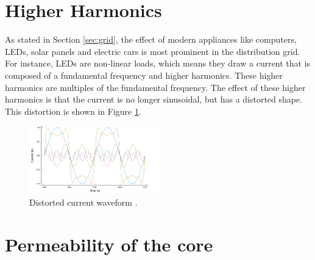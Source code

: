 \section{Higher Harmonics}
As stated in Section \ref{sec:grid}, the effect of modern appliances like computers, LEDs, solar panels and electric cars is most prominent in the distribution grid.
For instance, LEDs are non-linear loads, which means they draw a current that is composed of a fundamental frequency and higher harmonics.
These higher harmonics are multiples of the fundamental frequency. The effect of these higher harmonics is that the current is no longer sinusoidal, but has a distorted shape.
This distortion is shown in Figure \ref{fig:higherharmonics}.
\begin{figure}
    \centering
    \includegraphics[width=0.5\textwidth]{img/higher_harmonics.png}
    \caption{Distorted current waveform \cite{vanDijk2022}.}
    \label{fig:higherharmonics}
\end{figure}

\section{Permeability of the core}
